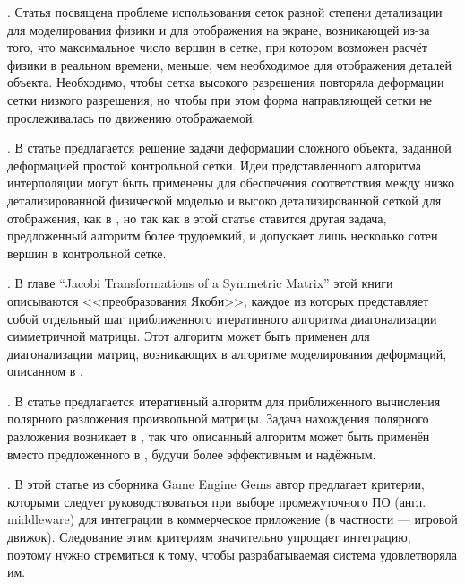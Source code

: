 \documentclass[a4paper,11pt]{report}
\begin{document}
    \cite[Deforming a High-Resolution Mesh...]{visser-mapping}. Статья посвящена проблеме
      использования сеток разной степени детализации для моделирования физики и для отображения на
      экране, возникающей из-за того, что максимальное число вершин в сетке, при котором возможен
      расчёт физики в реальном времени, меньше, чем необходимое для отображения деталей объекта.
      Необходимо, чтобы сетка высокого разрешения повторяла деформации сетки низкого разрешения, но
      чтобы при этом форма направляющей сетки не прослеживалась по движению отображаемой.

    \cite[Efficient Mesh Deformation Using Tetrahedron Control Mesh]{huang-control-mesh}.
      В статье предлагается решение задачи деформации сложного объекта, заданной деформацией простой
      контрольной сетки. Идеи представленного алгоритма интерполяции могут быть применены для
      обеспечения соответствия между низко детализированной физической моделью и высоко детализированной
      сеткой для отображения, как в \cite{visser-mapping}, но так как в этой статье ставится другая
      задача, предложенный алгоритм более трудоемкий, и допускает лишь несколько сотен вершин в
      контрольной сетке.

    \cite[Numerical Recipes...]{fortran-jacobi}. В главе {\English ``Jacobi Transformations of
      a Symmetric Matrix''} этой книги описываются <<преобразования Якоби>>, каждое из которых
      представляет собой отдельный шаг приближенного итеративного алгоритма диагонализации
      симметричной матрицы. Этот алгоритм может быть применен для диагонализации матриц, возникающих
      в алгоритме моделирования деформаций, описанном в \cite{muller-meshless}.
      
    \cite[Frobenius Iteration for the Matrix Polar Decomposition]{hp-polar}. В статье
      предлагается итеративный алгоритм для приближенного вычисления полярного разложения
      произвольной матрицы. Задача нахождения полярного разложения возникает в \cite{muller-meshless},
      так что описанный алгоритм может быть применён вместо предложенного в \cite{muller-meshless},
      будучи более эффективным и надёжным.

    \cite[What to Look for When Evaluating Middleware for Integration]{gems-middleware}. В
      этой статье из сборника {\English Game Engine Gems} автор предлагает критерии, которыми
      следует руководствоваться при выборе промежуточного ПО (англ. {\English middleware}) для интеграции в
      коммерческое приложение (в частности --- игровой движок). Следование этим критериям
      значительно упрощает интеграцию, поэтому нужно стремиться к тому, чтобы разрабатываемая
      система удовлетворяла им.
\end{document}
